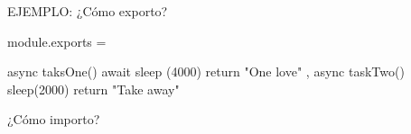 EJEMPLO:
¿Cómo exporto?

module.exports = {

    async taksOne(){
        await sleep (4000)
        return "One love"
    },
    async taskTwo(){
        sleep(2000)
        return "Take away"
    }


}

¿Cómo importo?
